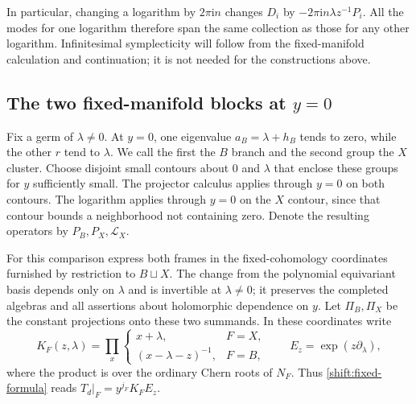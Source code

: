 In particular, changing a logarithm by $2\pi\mathrm i n$ changes
$D_i$ by $-2\pi\mathrm i n\lambda z^{-1}P_i$.  All the modes for
one logarithm therefore span the same collection as those for any
other logarithm.  Infinitesimal symplecticity will follow from the
fixed-manifold calculation and continuation; it is not needed for
the constructions above.

\subsection{The two fixed-manifold blocks at \texorpdfstring{$y=0$}{y=0}}

Fix a germ of $\lambda\neq0$.  At $y=0$, one eigenvalue
$a_B=\lambda+h_B$ tends to zero, while the other $r$ tend to
$\lambda$.  We call the first the $B$ branch and the second group
the $X$ cluster.  Choose disjoint small contours about $0$ and
$\lambda$ that enclose these groups for $y$ sufficiently small.
The projector calculus applies through $y=0$ on both contours.
The logarithm applies through $y=0$ on the $X$ contour, since that
contour bounds a neighborhood not containing zero.  Denote the
resulting operators by $P_B,P_X,\mathscr L_X$.

For this comparison express both frames in the fixed-cohomology
coordinates furnished by restriction to $B\sqcup X$.  The change
from the polynomial equivariant basis depends only on $\lambda$
and is invertible at $\lambda\neq0$; it preserves the completed
algebras and all assertions about holomorphic dependence on $y$.
Let $\Pi_B,\Pi_X$ be the constant projections onto these two
summands.  In these coordinates write
\[
 K_F(z,\lambda)=
 \prod_{x}\begin{cases}
      x+\lambda,&F=X,\\
      (x-\lambda-z)^{-1},&F=B,
 \end{cases}
 \qquad E_z=\exp(z\partial_\lambda),
\]
where the product is over the ordinary Chern roots of $N_F$.
Thus \eqref{shift:fixed-formula} reads
$T_d|_F=y^{j_F}K_F E_z$.

